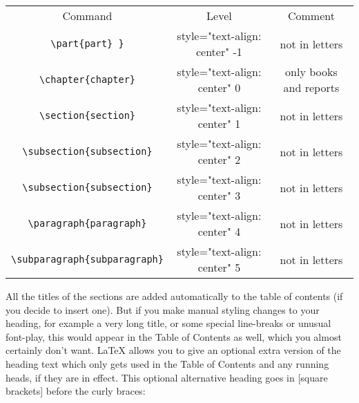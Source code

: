 \begin{tabular}{c c c}
 Command &
 Level &
 Comment \\
 \verb|\part{part} }| &
 style="text-align: center"  -1 &
 not in letters \\
 \verb|\chapter{chapter}| &
 style="text-align: center"  0 &
 only books and reports \\
 \verb|\section{section}| &
 style="text-align: center"  1 &
 not in letters \\
 \verb|\subsection{subsection}| &
 style="text-align: center"  2 &
 not in letters \\
 \verb|\subsection{subsection}| &
 style="text-align: center"  3 &
 not in letters \\
 \verb|\paragraph{paragraph}| &
 style="text-align: center"  4 &
 not in letters \\
 \verb|\subparagraph{subparagraph}| &
 style="text-align: center"  5 &
 not in letters \\
\end{tabular}

All the titles of the sections are added automatically to the table of contents
(if you decide to insert one). But if you make manual styling changes to your
heading, for example a very long title, or some special line-breaks or unusual
font-play, this would appear in the Table of Contents as well, which you almost
certainly don't want. LaTeX allows you to give an optional extra version of the
heading text which only gets used in the Table of Contents and any running
heads, if they are in effect. This optional alternative heading goes in [square
brackets] before the curly braces:

